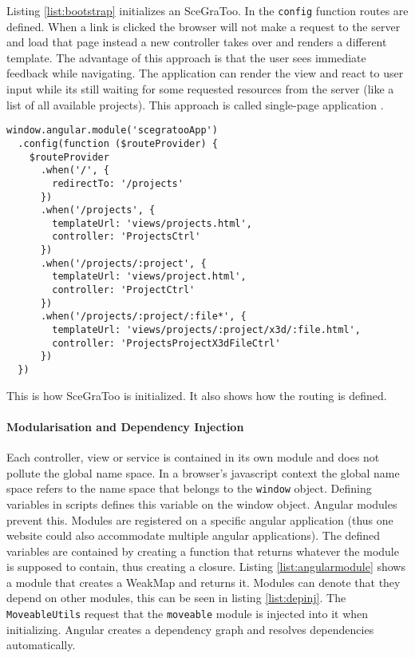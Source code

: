 Listing \ref{list:bootstrap} initializes an SceGraToo. In the \texttt{config}
function routes are defined. When a link is clicked the browser will not make a
request to the server and load that page instead a new controller takes over and
renders a different template. The advantage of this approach is that the user
sees immediate feedback while navigating. The application can render the view and
react to user input while its still waiting for some requested resources from
the server (like a list of all available projects). This approach is called
single-page application \cite{Mikowski:2013:SPW:2663433}.

\begin{listing}
  \begin{verbatim}
window.angular.module('scegratooApp')
  .config(function ($routeProvider) {
    $routeProvider
      .when('/', {
        redirectTo: '/projects'
      })
      .when('/projects', {
        templateUrl: 'views/projects.html',
        controller: 'ProjectsCtrl'
      })
      .when('/projects/:project', {
        templateUrl: 'views/project.html',
        controller: 'ProjectCtrl'
      })
      .when('/projects/:project/:file*', {
        templateUrl: 'views/projects/:project/x3d/:file.html',
        controller: 'ProjectsProjectX3dFileCtrl'
      })
  })
  \end{verbatim}
  \caption{This is how \gls{SceGraToo} is initialized. It also shows how the routing is defined.}
  \label{list:bootstrap}
\end{listing}

\paragraph{Modularisation and Dependency Injection}
\label{par:modularisation}

Each controller, view or service is contained in its own module and does not
pollute the global name space. In a browser's javascript context the global
name space refers to the name space that belongs to the \texttt{window} object.
Defining variables in scripts defines this variable on the window object.
Angular modules prevent this. Modules are registered on a specific angular
application (thus one website could also accommodate multiple angular
applications). The defined variables are contained by creating a function that
returns whatever the module is supposed to contain, thus creating a closure.
Listing \ref{list:angularmodule} shows a module that creates a WeakMap and
returns it. Modules can denote that they depend on other modules, this can be
seen in listing \ref{list:depinj}. The \texttt{MoveableUtils} request that the
\texttt{moveable} module is injected into it when initializing. Angular creates
a dependency graph and resolves dependencies automatically.


